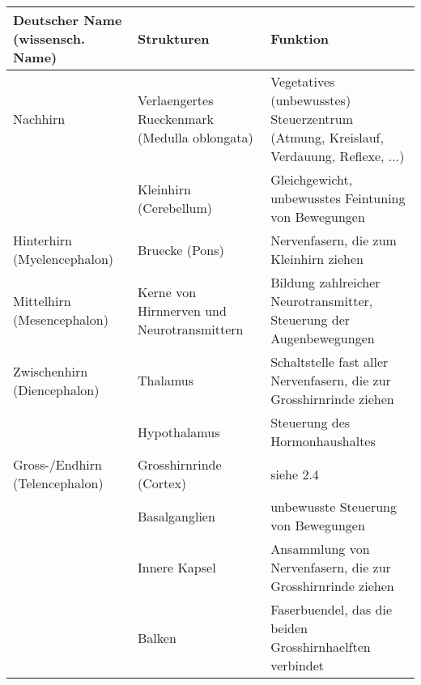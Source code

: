 \begin{table}[h]
\begin{tabularx}{\textwidth}{XXX}
\hline

Deutscher Name (wissensch. Name)              & Strukturen                                    & Funktion                                                                             \\ \hline
Nachhirn                                      & Verlaengertes Rueckenmark (Medulla oblongata) & Vegetatives (unbewusstes) Steuerzentrum (Atmung, Kreislauf, Verdauung, Reflexe, ...) \\ \hline
                                              & Kleinhirn (Cerebellum)                        & Gleichgewicht, unbewusstes Feintuning von Bewegungen                                 \\ \cline{2-3} 
\multirow{-2}{*}{Hinterhirn (Myelencephalon)} & Bruecke (Pons)                                & Nervenfasern, die zum Kleinhirn ziehen                                               \\ \hline
Mittelhirn (Mesencephalon)                    & Kerne von Hirnnerven und Neurotransmittern    & Bildung zahlreicher Neurotransmitter, Steuerung der Augenbewegungen                  \\ \hline
Zwischenhirn (Diencephalon)                   & Thalamus                                      & Schaltstelle fast aller Nervenfasern, die zur Grosshirnrinde ziehen                   \\ \cline{2-3} 
                                              & Hypothalamus                                  & Steuerung des Hormonhaushaltes                                                       \\ \hline
Gross-/Endhirn (Telencephalon)                 & Grosshirnrinde (Cortex)                        & siehe 2.4                                                                            \\ \cline{2-3} 
                                              & Basalganglien                                 & unbewusste Steuerung von Bewegungen                                                  \\ \cline{2-3} 
                                              & Innere Kapsel                                 & Ansammlung von Nervenfasern, die zur Grosshirnrinde ziehen                            \\ \cline{2-3} 
                                              & Balken                                        & Faserbuendel, das die beiden Grosshirnhaelften verbindet                              \\ \hline
\end{tabularx}
\end{table}



